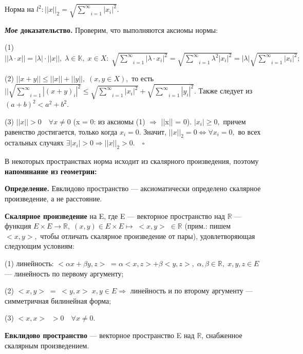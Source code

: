 \documentclass[12pt,a4paper]{article}
\begin{document}
Норма на $l^2: ||x||_{2} = \sqrt{\underset{i = 1}{\overset{\infty}{\sum}}|x_{i}|^2}.$ 

\textbf{\textit{Мое} доказательство.} Проверим, что выполняются аксиомы нормы: 

(1) $||\lambda \cdot x|| = |\lambda| \cdot ||x||, \; \lambda \in \mathbb{K}, \; x \in X:\! \;  \sqrt{\underset{i = 1}{\overset{\infty}{\sum}}|\lambda \cdot x_{i}|^2} = \sqrt{\underset{i = 1}{\overset{\infty}{\sum}}\lambda^{2}|x_{i}|^2} = |\lambda|  \sqrt{\underset{i = 1}{\overset{\infty}{\sum}}|x_{i}|^2};$ 

(2) $||x + y|| \leq ||x|| + ||y||, \; (x, y \in X),$ то есть $||\sqrt{\underset{i = 1}{\overset{\infty}{\sum}}|(x + y)_{i}|^2} \leq \sqrt{\underset{i = 1}{\overset{\infty}{\sum}}|x_{i}|^2} + \sqrt{\underset{i = 1}{\overset{\infty}{\sum}}|y_{i}|^2}.$ Также следует из $(a + b)^{2} < a^{2} + b^{2}.$

(3) $||x|| > 0 \quad \forall x \neq 0$ (x = 0: из аксиомы (1) $\Rightarrow$ ||x|| = 0). $|x_{i}| \geq 0,$ причем равенство достигается, только когда $x_{i} = 0.$ Значит, $||x||_{2} = 0 \Leftrightarrow \forall x_{i} = 0,$ во всех остальных случаях $\exists |x_{i}| > 0 \Rightarrow ||x||_{2} > 0. \quad \square$

В некоторых пространствах норма исходит из скалярного произведения, поэтому  \textbf{напоминание из геометрии:}

\textbf{Определение.} Евклидово пространство --- аксиоматически определено скалярное произведение, а не расстояние. 

\textbf{Скалярное произведение} на E, где E --- векторное пространство над $\mathbb{R}$ --- функция $E \times E \to \mathbb{R}, \; (x, y) \in E \times E \mapsto \; <\!\!x, y \!\!> \; \in \mathbb{R}$ (прим.: пишем $<\!\!x, y \!\!>,$ чтобы отличать скалярное произведение от пары), удовлетворяющая следующим условиям: 

(1) линейность: $<\!\!\alpha x + \beta y, z\!\!> \; = \alpha <\!\!x, z\!\!> + \beta <\!\!y, z\!\!>, \; \alpha, \beta \in \mathbb{R}, \; x, y, z \in E$ --- линейность по первому аргументу; 

(2) $<\!\!x, y \!\!> \; = \; <\!\!y, x\!\!> \; x, y \in E \Rightarrow$ линейность и по второму аргументу --- симметричная билинейная форма; 

(3) $<\!\!x, x\!\!> \; \; > 0 \quad \forall x \neq 0$. 

\textbf{Евклидово пространство} --- векторное пространство E над $\mathbb{R}$, снабженное скалярным произведением. 
\end{document}
